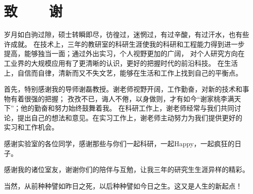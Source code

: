 \chapter*{致~~~~谢}

\vspace{2ex}
岁月如白驹过隙，硕士转瞬即尽，彷徨过，迷惘过，有过辛酸，有过汗水，也有些许成就。
在技术上，三年的教研室的科研生涯使我的科研和工程能力得到进一步提高，能够独当一面；通过外出实习，个人视野更加的广阔，
对个人研究方向在工业界的大规模应用有了更清晰的认识，更好的把握时代的前沿科技。
在生活上，自信而自律，清新而又不失文艺，能够在生活和工作上找到自己的平衡点。


首先，特别感谢我的导师谢磊教授。谢老师视野开阔，工作勤奋，对新的技术和事物有着很强的把握；
孜孜不已，诲人不倦，以身做则，才有如今“谢家桃李满天下”；他的勤奋和努力始终鼓舞着我。
在科研工作上，谢老师经常与我们共同讨论，提出自己的想法和意见。在实习工作上，谢老师主动努力为我们提供更好的
实习和工作机会。

感谢实验室的各位同学，感谢那些与你们一起科研，一起Happy，一起疯狂的日子。

感谢我的诸位室友，谢谢你们的陪伴与互勉，让我三年的研究生生涯异样的精彩。

当然，从前种种譬如昨日之死，以后种种譬如今日之生。这又是人生的新起点！


\clearpage

